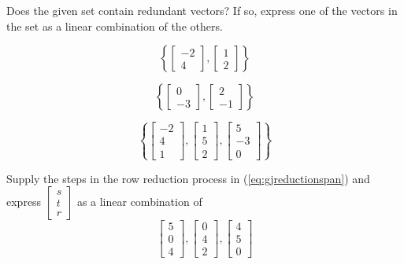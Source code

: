 \documentclass{ximera}
\begin{document}
\begin{problem}Does the given set contain redundant vectors?  If so, express one of the vectors in the set as a linear combination of the others.
\begin{problem}
  $$\left\{\begin{bmatrix}-2\\4\end{bmatrix},\begin{bmatrix}1\\2\end{bmatrix}\right\}$$
  \end{problem}
  
  \begin{problem}
  $$\left\{\begin{bmatrix}0\\-3\end{bmatrix},\begin{bmatrix}2\\-1\end{bmatrix}\right\}$$
  \end{problem}

  \begin{problem}
  $$\left\{\begin{bmatrix}-2\\4\\1\end{bmatrix},\begin{bmatrix}1\\5\\2\end{bmatrix}, \begin{bmatrix}5\\-3\\0\end{bmatrix}\right\}$$
  \end{problem}
  
\end{problem}

\begin{problem} Supply the steps in the row reduction process in (\ref{eq:gjreductionspan}) and express $\begin{bmatrix}s\\t\\r\end{bmatrix}$ as a linear combination of $$\begin{bmatrix}5\\0\\4\end{bmatrix},\begin{bmatrix}0\\4\\2\end{bmatrix},\begin{bmatrix}4\\5\\0\end{bmatrix}$$
\end{problem}
\end{document}
